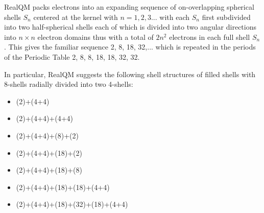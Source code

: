 \documentclass[11pt]{article} %
\begin{document}
RealQM packs electrons into an expanding sequence of on-overlapping spherical shells $S_n$ centered at the kernel with $n=1,2,3...$ with each $S_n$ first subdivided into two half-spherical shells each of which is divided into two angular directions into $n\times n$ electron domains thus with a total of $2n^2$ electrons in each full shell $S_n$.  This gives the familiar sequence 2,  8,  18,  32,... which is repeated in the periods of the Periodic Table 2,  8,  8,  18,  18,  32,  32.  

In particular,  RealQM suggests the following shell structures of filled shells with 8-shells radially divided into two 4-shells:
\begin{itemize}
\item (2)+(4+4)
\item (2)+(4+4)+(4+4) 
\item (2)+(4+4)+(8)+(2)
\item (2)+(4+4)+(18)+(2)
\item (2)+(4+4)+(18)+(8)
\item (2)+(4+4)+(18)+(18)+(4+4)
\item (2)+(4+4)+(18)+(32)+(18)+(4+4)
\end{itemize}
\end{document}
